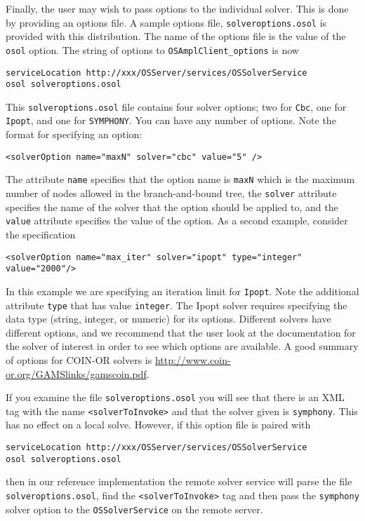 Finally, the user may wish to pass options to the individual solver. This is done by providing an options file.
A sample options file, {\tt solveroptions.osol} is 
provided with this distribution.  The name of the options file is the value of the {\tt osol} option.
The string of options to {\tt OSAmplClient\_options} is now
\begin{verbatim}
serviceLocation http://xxx/OSServer/services/OSSolverService
osol solveroptions.osol
\end{verbatim}
This   {\tt solveroptions.osol}  file contains four solver options; two for {\tt Cbc}, one for {\tt Ipopt}, 
and one for {\tt SYMPHONY}.
You can have any number of options. Note the format for specifying an option:
\begin{verbatim}
<solverOption name="maxN" solver="cbc" value="5" />
\end{verbatim}
The attribute {\tt name} specifies that the option name is {\tt maxN} which is the maximum number of nodes 
allowed in the branch-and-bound tree, the {\tt solver} attribute specifies the name of the solver that the 
option should be applied to, and the {\tt value} attribute specifies the value of the option. 
As a second example, consider the specification
\begin{verbatim}
<solverOption name="max_iter" solver="ipopt" type="integer" value="2000"/> 
\end{verbatim}
In this example we are specifying an iteration limit for {\tt Ipopt}.  Note the additional attribute 
{\tt type} that has value  {\tt integer}. The Ipopt solver requires specifying the data type 
(string, integer, or numeric) for its options.   Different solvers have different options, 
and we recommend that the user look at the documentation for the solver of interest in order to see 
which options are available.  
A good summary of options for COIN-OR solvers is \url{http://www.coin-or.org/GAMSlinks/gamscoin.pdf}.


If you examine the file {\tt solveroptions.osol} you will see that there is an XML tag  with the name
{\tt <solverToInvoke>} and that the solver given is {\tt symphony}.   
This has no effect on a local solve. However, if this option file is paired with 

\begin{verbatim}
serviceLocation http://xxx/OSServer/services/OSSolverService
osol solveroptions.osol
\end{verbatim}
then in our reference implementation the remote solver service will parse the file {\tt solveroptions.osol}, find the {\tt <solverToInvoke>} tag and then pass the {\tt symphony} solver option to the {\tt OSSolverService} on the remote server.


